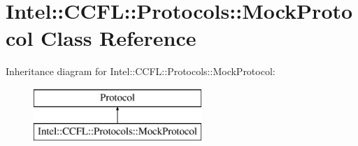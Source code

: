 \hypertarget{classIntel_1_1CCFL_1_1Protocols_1_1MockProtocol}{}\section{Intel\+:\+:C\+C\+F\+L\+:\+:Protocols\+:\+:Mock\+Protocol Class Reference}
\label{classIntel_1_1CCFL_1_1Protocols_1_1MockProtocol}
Inheritance diagram for Intel\+:\+:C\+C\+F\+L\+:\+:Protocols\+:\+:Mock\+Protocol\+:\begin{figure}[H]
\begin{center}
\leavevmode
\includegraphics[height=2.000000cm]{classIntel_1_1CCFL_1_1Protocols_1_1MockProtocol}
\end{center}
\end{figure}
